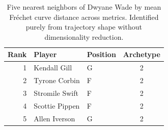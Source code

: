 \begin{table}[htbp]
  \centering\small
  \begin{tabular}{rllc}
    \toprule
    Rank & Player & Position & Archetype \\
    \midrule
    1 & Kendall Gill & G & 2 \\
    2 & Tyrone Corbin & F & 2 \\
    3 & Stromile Swift & F & 2 \\
    4 & Scottie Pippen & F & 2 \\
    5 & Allen Iverson & G & 2 \\
    \bottomrule
  \end{tabular}
  \caption{Five nearest neighbors of Dwyane Wade by mean Fr\'{e}chet curve distance across metrics. Identified purely from trajectory shape without dimensionality reduction.}
  \label{tab:Dwyane_Wade_frechet_curve_neighbors}
\end{table}

